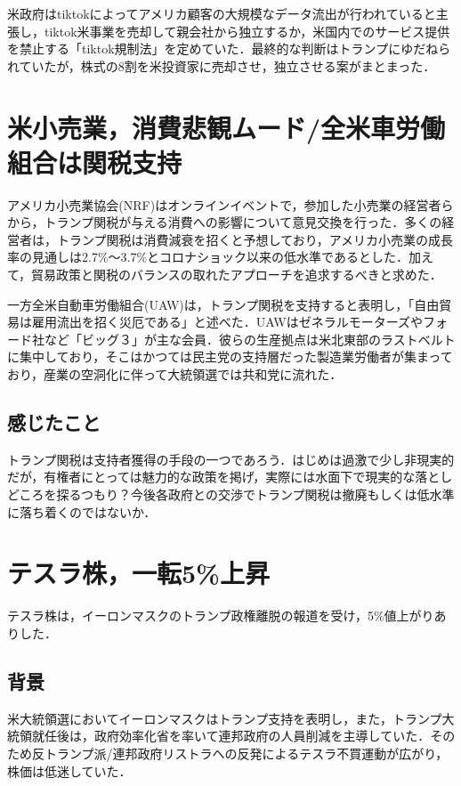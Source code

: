 \documentclass{ltjsarticle}
\begin{document}
米政府はtiktokによってアメリカ顧客の大規模なデータ流出が行われていると主張し，tiktok米事業を売却して親会社から独立するか，米国内でのサービス提供を禁止する「tiktok規制法」を定めていた．最終的な判断はトランプにゆだねられていたが，株式の8割を米投資家に売却させ，独立させる案がまとまった．


\section{米小売業，消費悲観ムード/全米車労働組合は関税支持}

アメリカ小売業協会(NRF)はオンラインイベントで，参加した小売業の経営者らから，トランプ関税が与える消費への影響について意見交換を行った．多くの経営者は，トランプ関税は消費減衰を招くと予想しており，アメリカ小売業の成長率の見通しは2.7\%～3.7\%とコロナショック以来の低水準であるとした．加えて，貿易政策と関税のバランスの取れたアプローチを追求するべきと求めた．

一方全米自動車労働組合(UAW)は，トランプ関税を支持すると表明し，「自由貿易は雇用流出を招く災厄である」と述べた．UAWはゼネラルモーターズやフォード社など「ビッグ３」が主な会員．彼らの生産拠点は米北東部のラストベルトに集中しており，そこはかつては民主党の支持層だった製造業労働者が集まっており，産業の空洞化に伴って大統領選では共和党に流れた．


\subsection{感じたこと}

トランプ関税は支持者獲得の手段の一つであろう．はじめは過激で少し非現実的だが，有権者にとっては魅力的な政策を掲げ，実際には水面下で現実的な落としどころを探るつもり？今後各政府との交渉でトランプ関税は撤廃もしくは低水準に落ち着くのではないか．


\section{テスラ株，一転5\%上昇}

テスラ株は，イーロンマスクのトランプ政権離脱の報道を受け，5\%値上がりありした．

\subsection{背景}

米大統領選においてイーロンマスクはトランプ支持を表明し，また，トランプ大統領就任後は，政府効率化省を率いて連邦政府の人員削減を主導していた．そのため反トランプ派/連邦政府リストラへの反発によるテスラ不買運動が広がり，株価は低迷していた．
\end{document}
